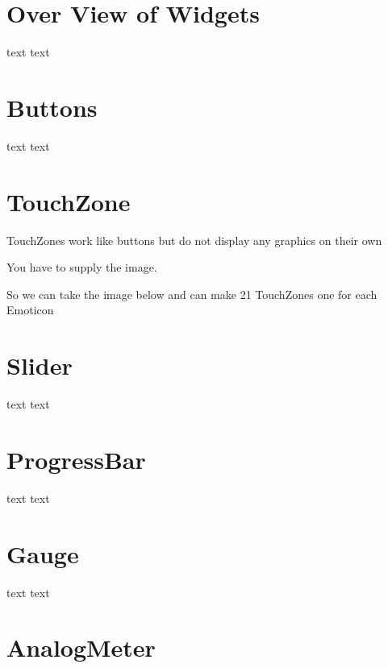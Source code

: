 \hypertarget{d0/d90/intro_widgets_overView}{}\section{Over View of Widgets}\label{d0/d90/intro_widgets_overView}
text text\par
 \hypertarget{d0/d90/intro_widgets_buttons}{}\section{Buttons}\label{d0/d90/intro_widgets_buttons}
text text\par
 

 \hypertarget{d0/d90/intro_widgets_touchZone}{}\section{Touch\-Zone}\label{d0/d90/intro_widgets_touchZone}
Touch\-Zones work like buttons but do not display any graphics on their own\par
 You have to supply the image.\par
 So we can take the image below and can make 21 Touch\-Zones one for each Emoticon\par
  \hypertarget{d0/d90/intro_widgets_slider}{}\section{Slider}\label{d0/d90/intro_widgets_slider}
text text\par
 \hypertarget{d0/d90/intro_widgets_progressBar}{}\section{Progress\-Bar}\label{d0/d90/intro_widgets_progressBar}
text text\par
 \hypertarget{d0/d90/intro_widgets_gauge}{}\section{Gauge}\label{d0/d90/intro_widgets_gauge}
 

text text\par
 \hypertarget{d0/d90/intro_widgets_analogMeter}{}\section{Analog\-Meter}\label{d0/d90/intro_widgets_analogMeter}
 

